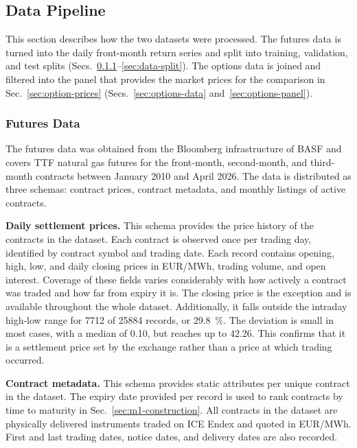 \subsection{Data Pipeline}\label{sec:data-pipeline}
This section describes how the two datasets were processed. The futures data is turned into the daily front-month return series and split into training, validation, and test splits (Secs.~\ref{sec:futures-data}--\ref{sec:data-split}). The options data is joined and filtered into the panel that provides the market prices for the comparison in Sec.~\ref{sec:option-prices} (Secs.~\ref{sec:options-data} and~\ref{sec:options-panel}).

\subsubsection{Futures Data}\label{sec:futures-data}
The futures data was obtained from the Bloomberg infrastructure of BASF and covers TTF natural gas futures for the front-month, second-month, and third-month contracts between January 2010 and April 2026. The data is distributed as three schemas: contract prices, contract metadata, and monthly listings of active contracts.

\textbf{Daily settlement prices.} This schema provides the price history of the contracts in the dataset. Each contract is observed once per trading day, identified by contract symbol and trading date. Each record contains opening, high, low, and daily closing prices in EUR/MWh, trading volume, and open interest. Coverage of these fields varies considerably with how actively a contract was traded and how far from expiry it is. The closing price is the exception and is available throughout the whole dataset. Additionally, it falls outside the intraday high-low range for \num{7712} of \num{25884} records, or \SI{29.8}{\percent}. The deviation is small in most cases, with a median of \SI{0.10}{\eurmwh}, but reaches up to \SI{42.26}{\eurmwh}. This confirms that it is a settlement price set by the exchange rather than a price at which trading occurred.

\textbf{Contract metadata.} This schema provides static attributes per unique contract in the dataset. The expiry date provided per record is used to rank contracts by time to maturity in Sec.~\ref{sec:m1-construction}. All contracts in the dataset are physically delivered instruments traded on ICE Endex and quoted in EUR/MWh. First and last trading dates, notice dates, and delivery dates are also recorded.

